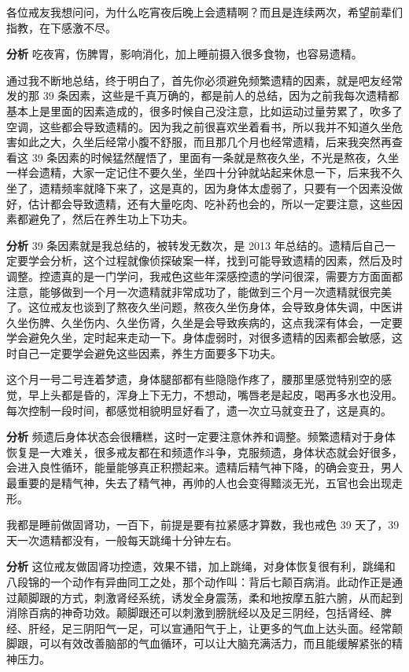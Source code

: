 \begin{case}
    各位戒友我想问问，为什么吃宵夜后晚上会遗精啊？而且是连续两次，希望前辈们指教，在下感激不尽。

    \textbf{分析} 吃夜宵，伤脾胃，影响消化，加上睡前摄入很多食物，也容易遗精。
\end{case}

\begin{case}
    通过我不断地总结，终于明白了，首先你必须避免频繁遗精的因素，就是吧友经常发的那 39 条因素，这些是千真万确的，都是前人的总结，因为之前我每次遗精都基本上是里面的因素造成的，很多时候自己没注意，比如运动过量劳累了，吹多了空调，这些都会导致遗精的。因为我之前很喜欢坐着看书，所以我并不知道久坐危害如此之大，久坐后经常小腹不舒服，而且那几个月也经常遗精，后来我突然再查看这 39 条因素的时候猛然醒悟了，里面有一条就是熬夜久坐，不光是熬夜，久坐一样会遗精，大家一定记住不要久坐，坐四十分钟就站起来休息一下，后来我不久坐了，遗精频率就降下来了，这是真的，因为身体太虚弱了，只要有一个因素没做好，估计都会导致遗精，还有大量吃肉、吃补药也会的，所以一定要注意，这些因素都避免了，然后在养生功上下功夫。

    \textbf{分析} 39 条因素就是我总结的，被转发无数次，是 2013 年总结的。遗精后自己一定要学会分析，这个过程就像侦探破案一样，找到可能导致遗精的因素，然后及时调整。控遗真的是一门学问，我戒色这些年深感控遗的学问很深，需要方方面面都注意，能够做到一个月一次遗精就非常成功了，能做到三个月一次遗精就很完美了。这位戒友也谈到了熬夜久坐问题，熬夜久坐伤身体，会导致身体失调，中医讲久坐伤脾、久坐伤内、久坐伤肾，久坐是会导致疾病的，这点我深有体会，一定要学会避免久坐，定时起来走动一下。身体虚弱时，对很多遗精的因素都会敏感，这时自己一定要学会避免这些因素，养生方面要多下功夫。
\end{case}

\begin{case}
    这个月一号二号连着梦遗，身体腿部都有些隐隐作疼了，腰那里感觉特别空的感觉，早上头都是昏的，浑身上下无力，不想动，嘴唇老是起皮，喝再多水也没用。每次控制一段时间，都感觉相貌明显好看了，遗一次立马就变丑了，这是真的。

    \textbf{分析} 频遗后身体状态会很糟糕，这时一定要注意休养和调整。频繁遗精对于身体恢复是一大难关，很多戒友都在和频遗作斗争，克服频遗，身体状态就会好很多，会进入良性循环，能量能够真正积攒起来。遗精后精气神下降，的确会变丑，男人最重要的是精气神，失去了精气神，再帅的人也会变得黯淡无光，五官也会出现走形。
\end{case}

\begin{case}
    我都是睡前做固肾功，一百下，前提是要有拉紧感才算数，我也戒色 39 天了，39 天一次遗精都没有，一般每天跳绳十分钟左右。

    \textbf{分析} 这位戒友做固肾功控遗，效果不错，加上跳绳，对身体恢复很有利，跳绳和八段锦的一个动作有异曲同工之处，那个动作叫：背后七颠百病消。此动作正是通过颠脚跟的方式，刺激肾经系统，诱发全身震荡，柔和地按摩五脏六腑，从而起到消除百病的神奇功效。颠脚跟还可以刺激到膀胱经以及足三阴经，包括肾经、脾经、肝经，足三阴阳气一足，可以宣通阳气于上，让更多的气血上达头面。经常颠脚跟，可以有效改善脑部的气血循环，可以让大脑充满活力，而且能缓解紧张的精神压力。
\end{case}

